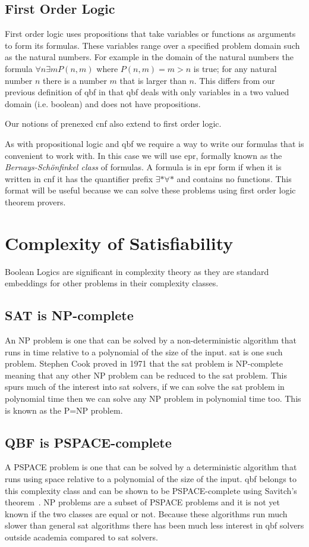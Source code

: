 \subsection{First Order Logic}
First order logic uses propositions that take variables or functions as arguments to form its formulas. These variables range over a specified problem domain such as the natural numbers. For example in the domain of the natural numbers the formula $\forall n \exists m P(n, m)$ where $P(n, m) = m > n$ is true; for any natural number $n$ there is a number $m$ that is larger than $n$. This differs from our previous definition of \gls{qbf} in that \gls{qbf} deals with only variables in a two valued domain (i.e. boolean) and does not have propositions.

Our notions of prenexed \gls{cnf} also extend to first order logic.

As with propositional logic and \gls{qbf} we require a way to write our formulas that is convenient to work with. In this case we will use \gls{epr}, formally known as the \textit{Bernays-Sch{\"o}nfinkel class} of formulas. A formula is in \gls{epr} form if when it is written in \gls{cnf} it has the quantifier prefix $\exists * \forall *$ and contains no functions. This format will be useful because we can solve these problems using first order logic theorem provers.

\section{Complexity of Satisfiability}
Boolean Logics are significant in complexity theory as they are standard embeddings for other problems in their complexity classes.

\subsection{SAT is NP-complete}
An NP problem is one that can be solved by a non-deterministic algorithm that runs in time relative to a polynomial of the size of the input. \Gls{sat} is one such problem. Stephen Cook proved in 1971 that the \gls{sat} problem is NP-complete~\cite{cookstheorem} meaning that any other NP problem can be reduced to the \gls{sat} problem. This spurs much of the interest into \gls{sat} solvers, if we can solve the \gls{sat} problem in polynomial time then we can solve any NP problem in polynomial time too. This is known as the P=NP problem.

\subsection{QBF is PSPACE-complete}
A PSPACE problem is one that can be solved by a deterministic algorithm that runs using space relative to a polynomial of the size of the input. \Gls{qbf} belongs to this complexity class and can be shown to be PSPACE-complete using Savitch's theorem~\cite{savitch}. NP problems are a subset of PSPACE problems and it is not yet known if the two classes are equal or not. Because these algorithms run much slower than general \gls{sat} algorithms there has been much less interest in \gls{qbf} solvers outside academia compared to \gls{sat} solvers.

